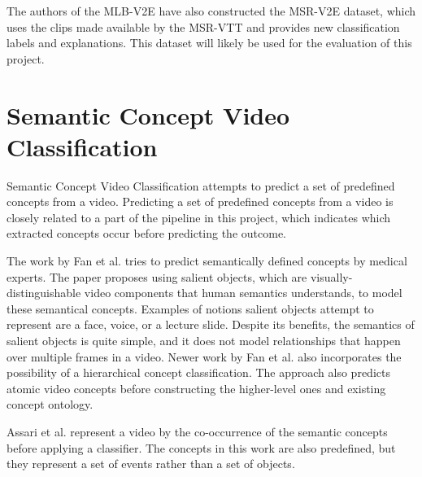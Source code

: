 The authors of the MLB-V2E \cite{RefWorks:RefID:16-2021automatic} have also constructed the MSR-V2E \cite{RefWorks:RefID:16-2021automatic} dataset, which uses the clips made available by the MSR-VTT and provides new classification labels and explanations.
This dataset will likely be used for the evaluation of this project.

\section{Semantic Concept Video Classification}

Semantic Concept Video Classification attempts to predict a set of predefined concepts from a video.
Predicting a set of predefined concepts from a video is closely related to a part of the pipeline in this project, which indicates which extracted concepts occur before predicting the outcome. 

The work by Fan et al. \cite{RefWorks:RefID:50-fan2004semantic} tries to predict semantically defined concepts by medical experts.
The paper proposes using salient objects, which are visually-distinguishable video components that human semantics understands, to model these semantical concepts.
Examples of notions salient objects attempt to represent are a face, voice, or a lecture slide.
Despite its benefits, the semantics of salient objects is quite simple, and it does not model relationships that happen over multiple frames in a video.
Newer work by Fan et al. \cite{RefWorks:RefID:51-jianping2007incorporating} also incorporates the possibility of a hierarchical concept classification. The approach also predicts atomic video concepts before constructing the higher-level ones and existing concept ontology.

Assari et al. \cite{RefWorks:RefID:52-assari2014video} represent a video by the co-occurrence of the semantic concepts before applying a classifier.
The concepts in this work are also predefined, but they represent a set of events rather than a set of objects.


